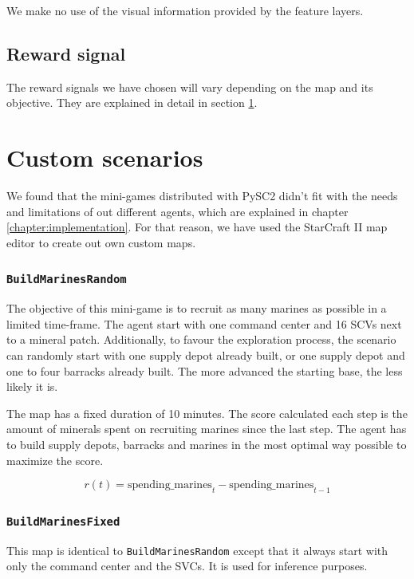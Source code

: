 We make no use of the visual information provided by the feature layers.

\subsection{Reward signal}

The reward signals we have chosen will vary depending on the map and its objective. They are explained in detail in section \ref{sec:mini-games}.

\section{Custom scenarios}
\label{sec:mini-games}

We found that the mini-games distributed with PySC2 didn't fit with the needs and limitations of out different agents, which are explained in chapter \ref{chapter:implementation}. For that reason, we have used the StarCraft II map editor to create out own custom maps.

\subsubsection*{\texttt{BuildMarinesRandom}}

The objective of this mini-game is to recruit as many marines as possible in a limited time-frame. The agent start with one command center and 16 SCVs next to a mineral patch. Additionally, to favour the exploration process, the scenario can randomly start with one supply depot already built, or one supply depot and one to four barracks already built. The more advanced the starting base, the less likely it is.

The map has a fixed duration of 10 minutes. The score calculated each step is the amount of minerals spent on recruiting marines since the last step. The agent has to build supply depots, barracks and marines in the most optimal way possible to maximize the score.

$$
r(t) = \text{spending\_marines}_{t} - \text{spending\_marines}_{t-1}
$$

\subsubsection*{\texttt{BuildMarinesFixed}}

This map is identical to \texttt{BuildMarinesRandom} except that it always start with only the command center and the SVCs. It is used for inference purposes.

